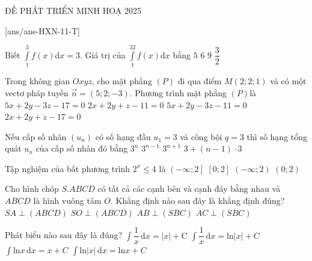 \def\sode{11}
\def\tendethi{ĐỀ PHÁT TRIỂN MINH HOẠ 2025}
\begin{dethi}
 {\tendethi}
\end{dethi}
\caulc
{}[ans/ans-HXN-\sode-T]
\begin{ex}%
 Biết $\int\limits_1^3f(x)\mathrm{d}x=3$. Giá trị của $\int\limits_1^32f(x)\mathrm{d}x$ bằng
 \choice
 {$5$}
 {\True $6$}
 {$9$}
 {$\dfrac{3}{2}$}
\end{ex}
\begin{ex}%
 Trong không gian $ Oxyz$, cho mặt phẳng $(P)$ đi qua điểm $ M\left(2;2;1\right)$ và có một vectơ pháp tuyến $\vec{n}=\left(5;2;-3\right)$. Phương trình mặt phẳng $(P)$là
 \choice
 {$5x+2y-3z-17=0$}
 {$2x+2y+z-11=0$}
 {\True $5x+2y-3z-11=0$}
 {$2x+2y+z-17=0$}
\end{ex}
\begin{ex}%
 Nếu cấp số nhân $\left(u_n\right)$ có số hạng đầu $u_1=3$ và công bội $ q=3$ thì số hạng tổng quát $u_n$ của cấp số nhân đó bằng
 \choice
 {\True $3^{n}$}
 {$3^{n-1}$}
 {$3^{n+1}$}
 {$3+\left(n-1\right)\cdot 3$}
\end{ex}
\begin{ex}%
 Tập nghiệm của bất phương trình $2^x\le 4$ là
 \choice
 {\True $\left(-\infty;2\right]$}
 {$\left[0;2\right]$}
 {$\left(-\infty;2\right)$}
 {$\left(0;2\right)$}
\end{ex}
\begin{ex}%
 Cho hình chóp $S.ABCD$ có tất cả các cạnh bên và cạnh đáy bằng nhau và $ABCD$ là hình vuông tâm $O$. Khẳng định nào sau đây là khẳng định đúng?
 \choice
 {$SA\perp\left(ABCD\right)$}
 {\True $SO\perp\left(ABCD\right)$}
 {$AB\perp\left(SBC\right)$}
 {$AC\perp\left(SBC\right)$}
\end{ex}
\begin{ex}%
 Phát biểu nào sau đây là đúng?
 \choice
 {$\int\dfrac{1}{x}\mathrm{\,d}x=\left| x\right|+\text{C}$}
 {\True $\int\dfrac{1}{x}\mathrm{\,d}x=\text{ln}\left| x\right|+C$}
 {$\int\text{ln}x\mathrm{\,d}x=x+C$}
 {$\int\text{ln}\left| x\right|\mathrm{\,d}x=\text{ln}x+C$}
\end{ex}
